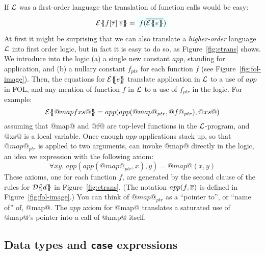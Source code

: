 If $\cal L$ was
a first-order language the translation of function calls would be easy:
$$
\etrans{\Sigma}{\Gamma}{f[\ol{\tau}]\;\ol{e}} = \formula{f(\ol{\etrans{}{}{e}})} \\
$$
At first it might be surprising that we can also translate a \emph{higher-order} language
$\cal L$ into first order logic, but in fact it is easy to do so, as
Figure~\ref{fig:etrans} shows.  We introduce into the logic
(a) a single new constant $app$, standing
for application, and (b) a nullary constant $f_{ptr}$ for each function $f$
(see Figure~\ref{fig:fol-image}).
Then, the equations for ${\cal E}\{\!\!\{e\}\!\!\}$ translate application in $\cal L$ to
a use of $app$ in FOL, and any mention of function $f$ in $\cal L$ to a use
of $f_{ptr}$ in the logic.  For example:
$$
{\cal E}\{\!\!\{@map f xs@\}\!\!\} = app( app( @map@_{ptr}, @f@_{ptr}), @xs@)
$$
assuming that @map@ and @f@ are top-level functions in the $\cal L$-program, and
@xs@ is a local variable.  Once enough $app$ applications stack up, so that
$@map@_{ptr}$ is applied to two arguments, can invoke @map@ directly in the logic,
an idea we expression with the following axiom:
$$
\forall x y.\;app(app(@map@_{ptr}, x), y) = @map@(x,y)
$$
These axioms, one for each function $f$, are generated by the second
clause of the rules for ${\cal D}\{\!\!\{d\}\!\!\}$ in Figure~\ref{fig:etrans}.
(The notation $app(f,\overline{x})$ is defined in Figure~\ref{fig:fol-image}.)
You can think of $@map@_{ptr}$ as a ``pointer to'', or ``name of'' of, @map@.
The $app$ axiom for @map@ translates a saturated use of @map@'s pointer into
a call of @map@ itself.

\subsection{Data types and {\tt case} expressions} \label{s:case-fol}

